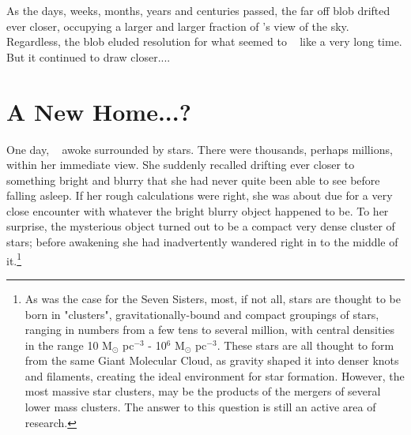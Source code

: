 \documentclass[main.tex]{subfiles}
\begin{document}
\par \nar As the days, weeks, months, years and centuries passed, the far off blob drifted ever closer, occupying a larger and larger fraction of \rmsterope's view of the sky.  Regardless, the blob eluded resolution for what seemed to \rmsterope~ like a very long time.  But it continued to draw closer....

\section{A New Home...?}

\par \nar One day, \rmsterope~  awoke surrounded by stars.  There were thousands, perhaps millions, within her immediate view.  She suddenly recalled drifting ever closer to something bright and blurry that she had never quite been able to see before falling asleep.  If her rough calculations were right, she was about due for a very close encounter with whatever the bright blurry object happened to be.  To her surprise, the mysterious object turned out to be a compact very dense cluster of stars; before awakening she had inadvertently wandered right in to the middle of it.\footnote{As was the case for the Seven Sisters, most, if not all, stars are thought to be born in "clusters", gravitationally-bound and compact groupings of stars, ranging in numbers from a few tens to several million, with central densities in the range 10 M$_{\odot}$ pc$^{-3}$ - 10$^6$ M$_{\odot}$ pc$^{-3}$.  These stars are all thought to form from the same Giant Molecular Cloud, as gravity shaped it into denser knots and filaments, creating the ideal environment for star formation.  However, the most massive star clusters, may be the products of the mergers of several lower mass clusters.  The answer to this question is still an active area of research.}
\end{document}

